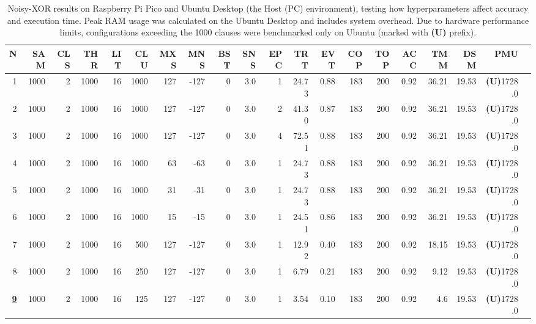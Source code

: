 \begin{table}
\centering
\scriptsize
\setlength{\tabcolsep}{2.5pt}
\caption[Noisy-XOR performance on Raspberry Pi Pico]{Noisy-XOR results on Raspberry Pi Pico and Ubuntu Desktop (the Host (PC) environment), testing how hyperparameters affect accuracy and execution time. Peak RAM usage was calculated on the Ubuntu Desktop and includes system overhead. Due to hardware performance limits, configurations exceeding the 1000 clauses were benchmarked only on Ubuntu (marked with \textbf{(U)} prefix)\label{tab:noisy-xor-pi-pico}.}
\begin{tabular}{@{}r r r r r r r r r r r r r r r r r r r r@{}} \toprule
    \textbf{N} & \textbf{SAM} & \textbf{CLS} & \textbf{THR} & \textbf{LIT} & \textbf{CLU} & \textbf{MXS} & \textbf{MNS} & \textbf{BST} & \textbf{SNS} & \textbf{EPC} & \textbf{TRT} & \textbf{EVT} & \textbf{COP} & \textbf{TOP} & \textbf{ACC} & \textbf{TMM} & \textbf{DSM} & \textbf{PMU} \\ \midrule
    1 & 1000 & 2 & 1000 & 16 & 1000 & 127 & -127 & 0 & 3.0 & 1 & 24.73 & 0.88 & 183 & 200 & 0.92 & 36.21 & 19.53 & \textbf{(U)}1728.0 \\
    2 & 1000 & 2 & 1000 & 16 & 1000 & 127 & -127 & 0 & 3.0 & 2 & 41.30 & 0.87 & 183 & 200 & 0.92 & 36.21 & 19.53 & \textbf{(U)}1728.0 \\
    3 & 1000 & 2 & 1000 & 16 & 1000 & 127 & -127 & 0 & 3.0 & 4 & 72.51 & 0.88 & 183 & 200 & 0.92 & 36.21 & 19.53 & \textbf{(U)}1728.0 \\
    4 & 1000 & 2 & 1000 & 16 & 1000 & 63 & -63 & 0 & 3.0 & 1 & 24.73 & 0.88 & 183 & 200 & 0.92 & 36.21 & 19.53 & \textbf{(U)}1728.0 \\
    5 & 1000 & 2 & 1000 & 16 & 1000 & 31 & -31 & 0 & 3.0 & 1 & 24.73 & 0.88 & 183 & 200 & 0.92 & 36.21 & 19.53 & \textbf{(U)}1728.0 \\
    6 & 1000 & 2 & 1000 & 16 & 1000 & 15 & -15 & 0 & 3.0 & 1 & 24.51 & 0.86 & 183 & 200 & 0.92 & 36.21 & 19.53 & \textbf{(U)}1728.0 \\
    7 & 1000 & 2 & 1000 & 16 & 500 & 127 & -127 & 0 & 3.0 & 1 & 12.92 & 0.40 & 183 & 200 & 0.92 & 18.15 & 19.53 & \textbf{(U)}1728.0 \\
    8 & 1000 & 2 & 1000 & 16 & 250 & 127 & -127 & 0 & 3.0 & 1 & 6.79 & 0.21 & 183 & 200 & 0.92 & 9.12 & 19.53 & \textbf{(U)}1728.0 \\
    \textbf{\underline{9}} & 1000 & 2 & 1000 & 16 & 125 & 127 & -127 & 0 & 3.0 & 1 & 3.54 & 0.10 & 183 & 200 & 0.92 & 4.6 & 19.53 & \textbf{(U)}1728.0 \\

\end{tabular}
\end{table}
